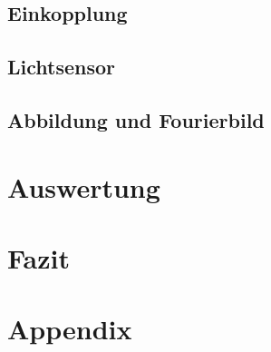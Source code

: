 \documentclass[12pt,a4paper]{article}
\begin{document}
	\subsection{Einkopplung}
	
	\subsection{Lichtsensor}
	
	\subsection{Abbildung und Fourierbild}
	
	
	\newpage
	\clearpage
	
	\section{Auswertung}
	\label{chap:auswertung}
	
	
	
	
	
	\section{Fazit} %
	
	
	
	\newpage
	\clearpage
	
	
	
	
	
	\newpage
	\clearpage
	
	
	
	
	
	
	\newpage
	
	\listoffigures %
	
	\newpage
	\clearpage
	
	\section{Appendix}
	
	
\end{document}
